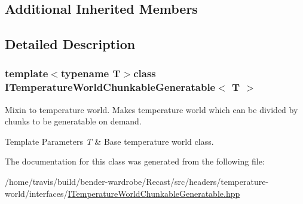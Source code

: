 \subsection*{Additional Inherited Members}


\subsection{Detailed Description}
\subsubsection*{template$<$typename T$>$class I\-Temperature\-World\-Chunkable\-Generatable$<$ T $>$}

Mixin to temperature world. Makes temperature world which can be divided by chunks to be generatable on demand.


\begin{DoxyTemplParams}{Template Parameters}
{\em T} & Base temperature world class. \\
\hline
\end{DoxyTemplParams}


The documentation for this class was generated from the following file\-:\begin{DoxyCompactItemize}
\item 
/home/travis/build/bender-\/wardrobe/\-Recast/src/headers/temperature-\/world/interfaces/\hyperlink{_i_temperature_world_chunkable_generatable_8hpp}{I\-Temperature\-World\-Chunkable\-Generatable.\-hpp}\end{DoxyCompactItemize}
